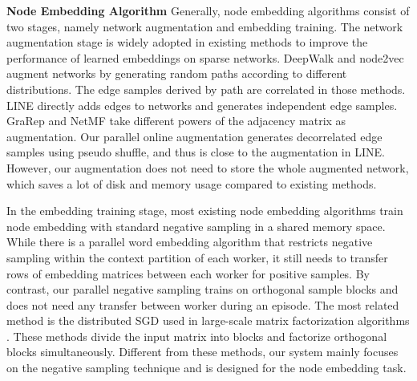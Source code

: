 \documentclass[sigconf]{acmart}
\begin{document}
\medskip \noindent \textbf{Node Embedding Algorithm}
Generally, node embedding algorithms consist of two stages, namely network augmentation and embedding training. The network augmentation stage is widely adopted in existing methods \cite{perozzi2014deepwalk, tang2015line, cao2015grarep, grover2016node2vec, qiu2018network} to improve the performance of learned embeddings on sparse networks. DeepWalk \cite{perozzi2014deepwalk} and node2vec \cite{grover2016node2vec} augment networks by generating random paths according to different distributions. The edge samples derived by path are correlated in those methods. LINE \cite{tang2015line} directly adds edges to networks and generates independent edge samples. GraRep \cite{cao2015grarep} and NetMF \cite{qiu2018network} take different powers of the adjacency matrix as augmentation. Our parallel online augmentation generates decorrelated edge samples using pseudo shuffle, and thus is close to the augmentation in LINE. However, our augmentation does not need to store the whole augmented network, which saves a lot of disk and memory usage compared to existing methods.

In the embedding training stage, most existing node embedding algorithms \cite{perozzi2014deepwalk, tang2015line, grover2016node2vec} train node embedding with standard negative sampling \cite{mikolov2013distributed} in a shared memory space. While there is a parallel word embedding algorithm \cite{stergiou2017distributed} that restricts negative sampling within the context partition of each worker, it still needs to transfer rows of embedding matrices between each worker for positive samples. By contrast, our parallel negative sampling trains on orthogonal sample blocks and does not need any transfer between worker during an episode. The most related method is the distributed SGD used in large-scale matrix factorization algorithms \cite{gemulla2011large, zhuang2013fast, yun2014nomad, bhavana2019bmf}. These methods divide the input matrix into  blocks and factorize orthogonal blocks simultaneously. Different from these methods, our system mainly focuses on the negative sampling technique and is designed for the node embedding task.
\end{document}
